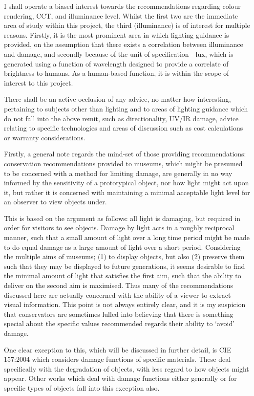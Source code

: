 I shall operate a biased interest towards the recommendations regarding colour rendering, \gls{CCT}, and illuminance level. Whilst the first two are the immediate area of study within this project, the third (illuminance) is of interest for multiple reasons. Firstly, it is the most prominent area in which lighting guidance is provided, on the assumption that there exists a correlation between illuminance and damage, and secondly because of the unit of specification - lux, which is generated using a function of wavelength designed to provide a correlate of brightness to humans. As a human-based function, it is within the scope of interest to this project.

There shall be an active occlusion of any advice, no matter how interesting, pertaining to subjects other than lighting and to areas of lighting guidance which do not fall into the above remit, such as directionality, UV/IR damage, advice relating to specific technologies and areas of discussion such as cost calculations or warranty considerations. 

Firstly, a general note regards the mind-set of those providing recommendations: conservation recommendations provided to museums, which might be presumed to be concerned with a method for limiting damage, are generally in no way informed by the sensitivity of a prototypical object, nor how light might act upon it, but rather it is concerned with maintaining a minimal acceptable light level for an observer to view objects under.

This is based on the argument as follows: all light is damaging, but required in order for visitors to see objects. Damage by light acts in a roughly reciprocal manner, such that a small amount of light over a long time period might be made to do equal damage as a large amount of light over a short period. Considering the multiple aims of museums; (1) to display objects, but also (2) preserve them such that they may be displayed to future generations, it seems desirable to find the minimal amount of light that satisfies the first aim, such that the ability to deliver on the second aim is maximised. Thus many of the recommendations discussed here are actually concerned with the ability of a viewer to extract visual information. This point is not always entirely clear, and it is my suspicion that conservators are sometimes lulled into believing that there is something special about the specific values recommended regards their ability to `avoid' damage. 

One clear exception to this, which will be discussed in further detail, is \gls{CIE} 157:2004 \citep{cie_cie_2004} which considers damage functions of specific materials. These deal specifically with the degradation of objects, with less regard to how objects might appear. Other works which deal with damage functions either generally or for specific types of objects fall into this exception also.

